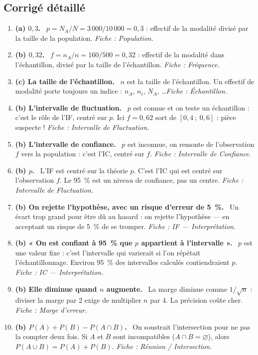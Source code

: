 \documentclass[11pt,a4paper]{article}
\begin{document}
	\subsection{Corrigé détaillé}
	\label{sec:corrige}
	
	\begin{enumerate}[leftmargin=*, label=\textbf{Q\arabic*.}]
		\item \textbf{(a) $0{,}3$.} \ $p = N_A / N = 3\,000 / 10\,000 = 0{,}3$ :
		effectif de la modalité divisé par la taille de la population.
		\emph{Fiche : Population.}
		\item \textbf{(b) $0{,}32$.} \ $f = n_A / n = 160 / 500 = 0{,}32$ : effectif de
		la modalité dans l'échantillon, divisé par la taille de l'échantillon.
		\emph{Fiche : Fréquence.}
		\item \textbf{(c) La taille de l'échantillon.} \ $n$ est la taille de
		l'échantillon. Un effectif de modalité porte toujours un indice :
		$n_A$, $n_i$, $N_A$, \ldots \emph{Fiche : Échantillon.}
		\item \textbf{(b) L'intervalle de fluctuation.} \ $p$ est connue et on teste un
		échantillon : c'est le rôle de l'IF, centré sur $p$. Ici $f = 0{,}62$ sort
		de $\left[0{,}4\ ;\ 0{,}6\right]$ : pièce suspecte !
		\emph{Fiche : Intervalle de Fluctuation.}
		\item \textbf{(b) L'intervalle de confiance.} \ $p$ est inconnue, on remonte de
		l'observation $f$ vers la population : c'est l'IC, centré sur $f$.
		\emph{Fiche : Intervalle de Confiance.}
		\item \textbf{(b) $p$.} \ L'IF est centré sur la théorie $p$. C'est l'IC qui
		est centré sur l'observation $f$. Le 95~\% est un niveau de confiance, pas
		un centre. \emph{Fiche : Intervalle de Fluctuation.}
		\item \textbf{(b) On rejette l'hypothèse, avec un risque d'erreur de 5~\%.} \
		Un écart trop grand pour être dû au hasard : on rejette l'hypothèse — en
		acceptant un risque de 5~\% de se tromper.
		\emph{Fiche : IF — Interprétation.}
		\item \textbf{(b) « On est confiant à 95~\% que $p$ appartient à
			l'intervalle ».} \ $p$ est une valeur fixe : c'est l'intervalle qui varierait
		si l'on répétait l'échantillonnage. Environ 95~\% des intervalles calculés
		contiendraient $p$. \emph{Fiche : IC — Interprétation.}
		\item \textbf{(b) Elle diminue quand $n$ augmente.} \ La marge diminue comme
		$1/\sqrt{n}$ : diviser la marge par 2 exige de multiplier $n$ par 4. La
		précision coûte cher. \emph{Fiche : Marge d'erreur.}
		\item \textbf{(b) $P\left(A\right) + P\left(B\right) - P\left(A \cap B\right)$.} \
		On soustrait l'intersection pour ne pas la compter deux fois. Si $A$ et $B$
		sont incompatibles ($A \cap B = \varnothing$), alors
		$P\left(A \cup B\right) = P\left(A\right) + P\left(B\right)$.
		\emph{Fiche : Réunion / Intersection.}
	\end{enumerate}
	
\end{document}
